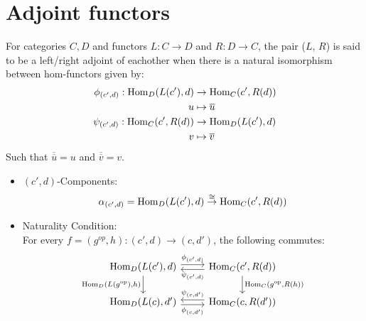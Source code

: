 \section{Adjoint functors}

\begin{definition}
  For categories $C, D$ and functors $L: C\to
  D$ and $R: D\to C$, the pair ($L$, $R$) is said to be a left/right adjoint of
  eachother when there is a natural isomorphism between hom-functors given by:
  \parencite{leinster:basic_category_theory}
  \[
    \begin{aligned}
      \phi_{(c', d)}: \mathrm{Hom}_D(L(c'), d) &\to \mathrm{Hom}_C(c', R(d))\\
      u &\mapsto \overline{u}\\
      \psi_{(c', d)}: \mathrm{Hom}_C(c', R(d)) &\to \mathrm{Hom}_D(L(c'), d)\\
      v &\mapsto \overline{v}
    \end{aligned}
  \]
  Such that $\overline{\overline{u}} = u$ and $\overline{\overline{v}} = v$.

  \begin{itemize}
    \item $(c', d)$-Components:
      \[
        \alpha_{(c', d)}
          = \mathrm{Hom}_D(L(c'), d) \overset{\cong}{\to} \mathrm{Hom}_C(c', R(d))\\
      \]
    \item Naturality Condition:\\
      For every $f = (g^{op}, h): (c', d) \to (c, d')$, the following commutes:
      \[\begin{tikzcd}[ampersand replacement=\&]
        {\Hom_D(L(c'), d)} \& {\Hom_C(c', R(d))} \\
        {\Hom_D(L(c),d')} \& {\Hom_C(c,R(d'))}
        \arrow["{\Hom_D(L(g^{\op}), h)}"', from=1-1, to=2-1]
        \arrow["{\Hom_C(g^{\op}, R(h))}", from=1-2, to=2-2]
        \arrow["{\phi_{(c', d)}}", shift left=1, from=1-1, to=1-2]
        \arrow["{\phi_{(c,d')}}"', shift right=1, from=2-1, to=2-2]
        \arrow["{\psi_{(c,d')}}"', shift right=1, from=2-2, to=2-1]
        \arrow["{\psi_{(c',d)}}", shift left=1, from=1-2, to=1-1]
      \end{tikzcd}\]


\end{itemize}
\end{definition}
